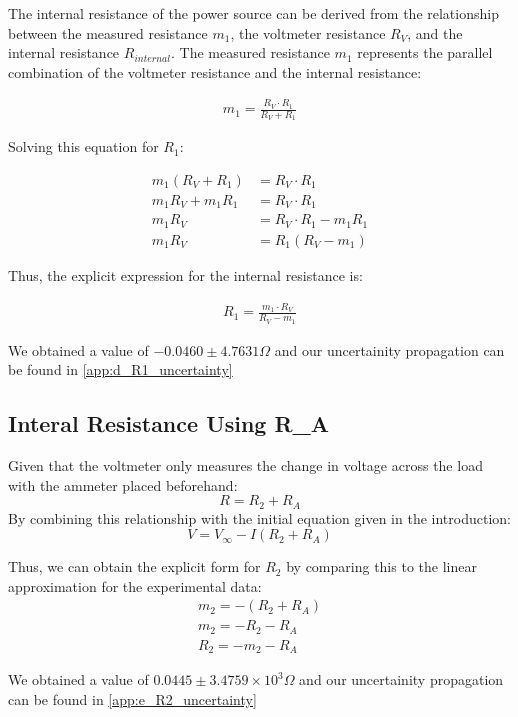 \documentclass{article} %
\begin{document}
The internal resistance of the power source can be derived from the relationship between the measured resistance $m_1$, the voltmeter resistance $R_V$, and the internal resistance $R_{internal}$. 
The measured resistance $m_1$ represents the parallel combination of the voltmeter resistance and the internal resistance:

\begin{align*}
m_1 = \frac{R_V \cdot R_{1}}{R_V + R_{1}}
\end{align*}

Solving this equation for $R_{1}$:

\begin{align*}
m_1 (R_V + R_{1}) &= R_V \cdot R_{1} \\
m_1 R_V + m_1 R_{1} &= R_V \cdot R_{1} \\
m_1 R_V &= R_V \cdot R_{1} - m_1 R_{1} \\
m_1 R_V &= R_{1} (R_V - m_1)
\end{align*}

Thus, the explicit expression for the internal resistance is:

\begin{align*}
R_{1} = \frac{m_1 \cdot R_V}{R_V - m_1}
\end{align*}

We obtained a value of $-0.0460 \pm 4.7631 \Omega$ and our uncertainity propagation can be found in \ref{app:d_R1_uncertainty}

\newpage

\subsection{Interal Resistance Using R\_A}

Given that the voltmeter only measures the change in voltage across the load with the ammeter placed beforehand:
\[
R = R_2 + R_A
\]
By combining this relationship with the initial equation given in the introduction:
\[
V = V_{\infty} - I(R_2 + R_A)
\]

Thus, we can obtain the explicit form for $R_2$ by comparing this to the linear approximation for the experimental data:
\begin{align*}
m_2 = -(R_2 + R_A) \\
m_2 = - R_2 - R_A \\
R_2 = -m_2 - R_A
\end{align*}

We obtained a value of $0.0445 \pm 3.4759 \times 10^3  \Omega$ and our uncertainity propagation can be found in \ref{app:e_R2_uncertainty}
\end{document}
